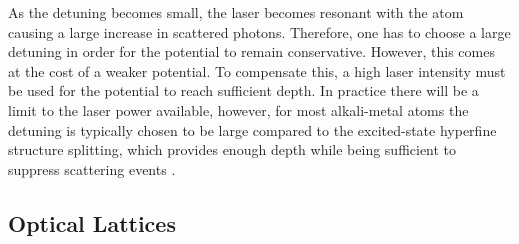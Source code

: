 As the detuning becomes small, the laser becomes resonant with the atom causing a large increase in scattered photons. Therefore, one has to choose a large detuning in order for the potential to remain conservative. However, this comes at the cost of a weaker potential. To compensate this, a high laser intensity must be used for the potential to reach sufficient depth. In practice there will be a limit to the laser power available, however, for most alkali-metal atoms the detuning is typically chosen to be large compared to the excited-state hyperfine structure splitting, which provides enough depth while being sufficient to suppress scattering events \cite{manybodyBloch}. 


\subsection{Optical Lattices}


